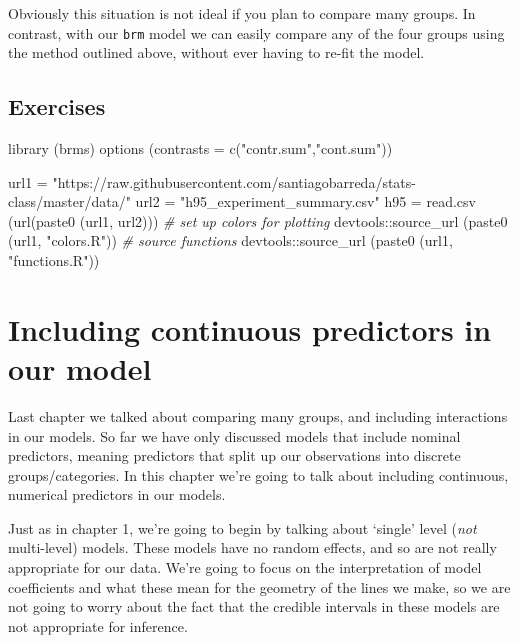 \documentclass[
]{book}
\newenvironment{Shaded}{\begin{snugshade}}{\end{snugshade}}
\newcommand{\AttributeTok}[1]{\textcolor[rgb]{0.77,0.63,0.00}{#1}}
\newcommand{\CommentTok}[1]{\textcolor[rgb]{0.56,0.35,0.01}{\textit{#1}}}
\newcommand{\FunctionTok}[1]{\textcolor[rgb]{0.00,0.00,0.00}{#1}}
\newcommand{\NormalTok}[1]{#1}
\newcommand{\OtherTok}[1]{\textcolor[rgb]{0.56,0.35,0.01}{#1}}
\newcommand{\SpecialCharTok}[1]{\textcolor[rgb]{0.00,0.00,0.00}{#1}}
\newcommand{\StringTok}[1]{\textcolor[rgb]{0.31,0.60,0.02}{#1}}
\begin{document}
Obviously this situation is not ideal if you plan to compare many groups. In contrast, with our \texttt{brm} model we can easily compare any of the four groups using the method outlined above, without ever having to re-fit the model.

\hypertarget{exercises-3}{%
\section{Exercises}\label{exercises-3}}

\begin{Shaded}
\begin{Highlighting}[]
\FunctionTok{library}\NormalTok{ (brms)}
\FunctionTok{options}\NormalTok{ (}\AttributeTok{contrasts =} \FunctionTok{c}\NormalTok{(}\StringTok{"contr.sum"}\NormalTok{,}\StringTok{"cont.sum"}\NormalTok{))}

\NormalTok{url1 }\OtherTok{=} \StringTok{"https://raw.githubusercontent.com/santiagobarreda/stats{-}class/master/data/"}
\NormalTok{url2 }\OtherTok{=} \StringTok{"h95\_experiment\_summary.csv"}
\NormalTok{h95 }\OtherTok{=} \FunctionTok{read.csv}\NormalTok{ (}\FunctionTok{url}\NormalTok{(}\FunctionTok{paste0}\NormalTok{ (url1, url2)))}
\CommentTok{\# set up colors for plotting}
\NormalTok{devtools}\SpecialCharTok{::}\FunctionTok{source\_url}\NormalTok{ (}\FunctionTok{paste0}\NormalTok{ (url1, }\StringTok{"colors.R"}\NormalTok{))}
\CommentTok{\# source functions}
\NormalTok{devtools}\SpecialCharTok{::}\FunctionTok{source\_url}\NormalTok{ (}\FunctionTok{paste0}\NormalTok{ (url1, }\StringTok{"functions.R"}\NormalTok{))}
\end{Highlighting}
\end{Shaded}

\hypertarget{including-continuous-predictors-in-our-model}{%
\chapter{Including continuous predictors in our model}\label{including-continuous-predictors-in-our-model}}

Last chapter we talked about comparing many groups, and including interactions in our models. So far we have only discussed models that include nominal predictors, meaning predictors that split up our observations into discrete groups/categories. In this chapter we're going to talk about including continuous, numerical predictors in our models.

Just as in chapter 1, we're going to begin by talking about `single' level (\emph{not} multi-level) models. These models have no random effects, and so are not really appropriate for our data. We're going to focus on the interpretation of model coefficients and what these mean for the geometry of the lines we make, so we are not going to worry about the fact that the credible intervals in these models are not appropriate for inference.
\end{document}

